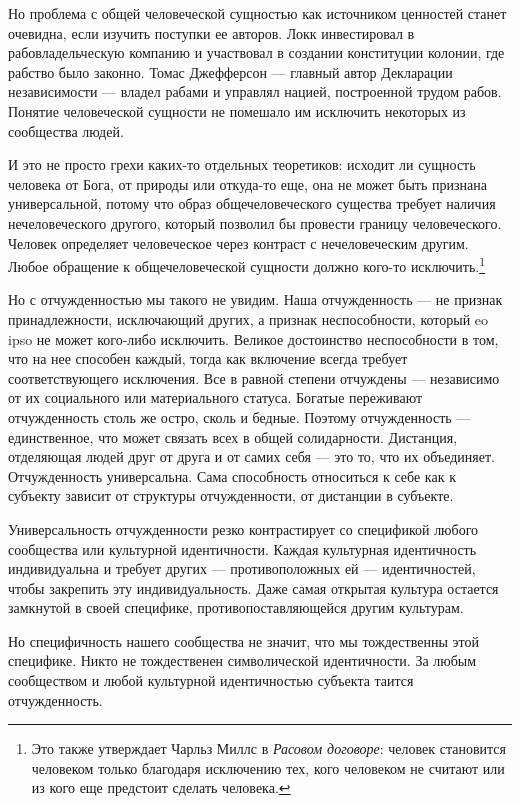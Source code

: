 \documentclass[12pt]{book}
\begin{document}
Но проблема с общей человеческой сущностью как источником ценностей станет очевидна, если изучить поступки ее авторов. Локк инвестировал в рабовладельческую компанию и участвовал в создании конституции колонии, где рабство было законно. Томас Джефферсон --- главный автор Декларации независимости --- владел рабами и управлял нацией, построенной трудом рабов. Понятие человеческой сущности не помешало им исключить некоторых из сообщества людей.

И это не просто грехи каких-то отдельных теоретиков: исходит ли сущность человека от Бога, от природы или откуда-то еще, она не может быть признана универсальной, потому что образ общечеловеческого существа требует наличия нечеловеческого другого, который позволил бы провести границу человеческого. Человек определяет человеческое через контраст с нечеловеческим другим. Любое обращение к общечеловеческой сущности должно кого-то исключить.\footnote{Это также утверждает Чарльз Миллс в \textit{Расовом договоре}: человек становится человеком только благодаря исключению тех, кого человеком не считают или из кого еще предстоит сделать человека.}

Но с отчужденностью мы такого не увидим. Наша отчужденность --- не признак принадлежности, исключающий других, а признак неспособности, который eo ipso не может кого-либо исключить. Великое достоинство неспособности в том, что на нее способен каждый, тогда как включение всегда требует соответствующего исключения. Все в равной степени отчуждены --- независимо от их социального или материального статуса. Богатые переживают отчужденность столь же остро, сколь и бедные. Поэтому отчужденность --- единственное, что может связать всех в общей солидарности. Дистанция, отделяющая людей друг от друга и от самих себя --- это то, что их объединяет. Отчужденность универсальна. Сама способность относиться к себе как к субъекту зависит от структуры отчужденности, от дистанции в субъекте.

Универсальность отчужденности резко контрастирует со спецификой любого сообщества или культурной идентичности. Каждая культурная идентичность индивидуальна и требует других --- противоположных ей --- идентичностей, чтобы закрепить эту индивидуальность. Даже самая открытая культура остается замкнутой в своей специфике, противопоставляющейся другим культурам.

Но специфичность нашего сообщества не значит, что мы тождественны этой специфике. Никто не тождественен символической идентичности. За любым сообществом и любой культурной идентичностью субъекта таится отчужденность.
\end{document}
